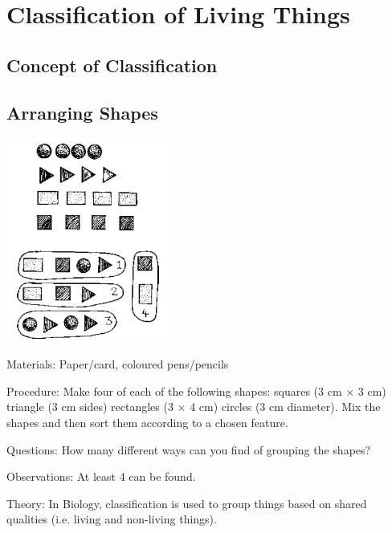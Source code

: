\section{Classification of Living Things}

\begin{multicols}{2}


\section*{Concept of Classification}


\subsection{Arranging Shapes} %

\begin{center}
\includegraphics[width=0.4\textwidth]{./img/source/arranging-shapes.png}
\end{center}

\begin{description*}
\item[Materials:]{Paper/card, coloured pens/pencils}
\item[Procedure:]{Make four of each of the following shapes: squares (3 cm $\times$ 3 cm) triangle (3 cm sides)
rectangles (3 $\times$ 4 cm) circles (3 cm diameter). Mix the shapes and then sort them according to
a chosen feature.}
\item[Questions:]{How many different ways can you find of grouping the shapes?}
\item[Observations:]{At least 4 can be found.}
\item[Theory:]{In Biology, classification is used to group things based on shared qualities (i.e. living and non-living things).}
\end{description*}


\end{multicols}
